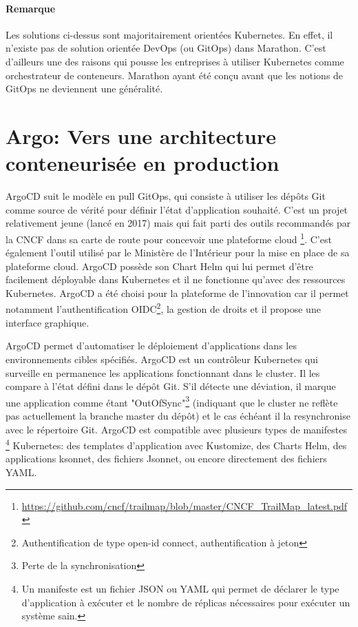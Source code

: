 \documentclass[11pt,fleqn]{book} %
\begin{document}
\begin{interrupt}
\paragraph{Remarque}
Les solutions ci-dessus sont majoritairement orientées Kubernetes. En effet, il n'existe pas de solution orientée DevOps (ou GitOps) dans Marathon. C'est d'ailleurs une des raisons qui pousse les entreprises à utiliser Kubernetes comme orchestrateur de conteneurs. Marathon ayant été conçu avant que les notions de GitOps ne deviennent une généralité.
\end{interrupt}
\section{Argo: Vers une architecture conteneurisée en production}

ArgoCD suit le modèle en pull GitOps, qui consiste à utiliser les dépôts Git comme source de vérité pour définir l'état d'application souhaité. C'est un projet relativement jeune (lancé en 2017) mais qui fait parti des outils recommandés par la CNCF dans sa carte de route pour concevoir une plateforme cloud \footnote{\url{https://github.com/cncf/trailmap/blob/master/CNCF_TrailMap_latest.pdf}}. C'est également l'outil utilisé par le Ministère de l'Intérieur pour la mise en place de sa plateforme cloud.  ArgoCD possède son Chart Helm qui lui permet d'être facilement déployable dans Kubernetes et il ne fonctionne qu'avec des ressources Kubernetes. ArgoCD a été choisi pour la plateforme de l'innovation car il permet notamment l'authentification OIDC\footnote{Authentification de type open-id connect, authentification à jeton}, la gestion de droits et il propose une interface graphique. \newline

ArgoCD permet d'automatiser le déploiement d'applications dans les environnements cibles spécifiés. ArgoCD est un contrôleur Kubernetes qui surveille en permanence les applications fonctionnant dans le cluster. Il les compare à l'état défini dans le dépôt Git. S'il détecte une déviation, il marque une application comme étant "OutOfSync"\footnote{Perte de la synchronisation} (indiquant que le cluster ne reflète pas actuellement la branche master du dépôt) et le cas échéant il la resynchronise avec le répertoire Git.  ArgoCD est compatible avec plusieurs types de manifestes \footnote{Un manifeste est un fichier JSON ou YAML qui permet de déclarer le type d'application à exécuter et le nombre de réplicas nécessaires pour exécuter un système sain.} Kubernetes: des templates d'application avec Kustomize, des Charts Helm, des applications ksonnet, des fichiers Jsonnet, ou encore directement des fichiers YAML.\newline
\end{document}
